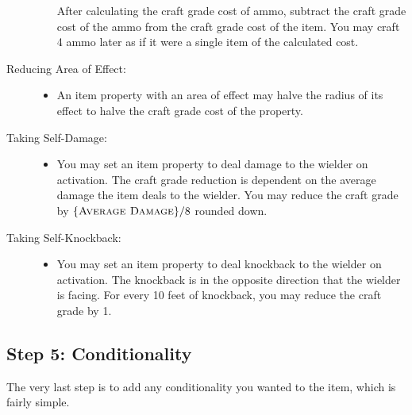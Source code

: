 \begin{description}
\begin{itemize}
		After calculating the craft grade cost of ammo, subtract the craft grade cost of the ammo from the craft grade cost of the item.
		You may craft 4 ammo later as if it were a single item of the calculated cost.
	\end{itemize}
	\item[Reducing Area of Effect:] \hfill
	\begin{itemize}
		\item An item property with an area of effect may halve the radius of its effect to halve the craft grade cost of the property.
	\end{itemize}
	\item[Taking Self-Damage:] \hfill
	\begin{itemize}
		\item You may set an item property to deal damage to the wielder on activation. The craft grade reduction is dependent on the average damage the item deals to the wielder. You may reduce the craft grade by $\{ \textsc{Average Damage} \}/8$ rounded down.
	\end{itemize}
	\item[Taking Self-Knockback:] \hfill
	\begin{itemize}
		\item You may set an item property to deal knockback to the wielder on activation. The knockback is in the opposite direction that the wielder is facing. For every 10 feet of knockback, you may reduce the craft grade by 1.
	\end{itemize}
\end{description}

\subsection{Step 5: Conditionality}
The very last step is to add any conditionality you wanted to the item, which is fairly simple.

